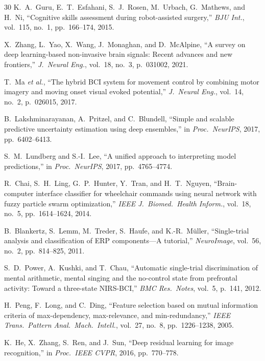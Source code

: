 \documentclass[conference]{IEEEtran}
\begin{document}
\begin{thebibliography}{30}
K.~A.~Guru, E.~T.~Esfahani, S.~J.~Rosen, M.~Urbach, G.~Mathews, and H.~Ni, ``Cognitive skills assessment during robot-assisted surgery,'' \emph{BJU Int.}, vol.~115, no.~1, pp.~166--174, 2015.

X.~Zhang, L.~Yao, X.~Wang, J.~Monaghan, and D.~McAlpine, ``A survey on deep learning-based non-invasive brain signals: Recent advances and new frontiers,'' \emph{J.\ Neural Eng.}, vol.~18, no.~3, p.~031002, 2021.

T.~Ma \emph{et al.}, ``The hybrid BCI system for movement control by combining motor imagery and moving onset visual evoked potential,'' \emph{J.\ Neural Eng.}, vol.~14, no.~2, p.~026015, 2017.

B.~Lakshminarayanan, A.~Pritzel, and C.~Blundell, ``Simple and scalable predictive uncertainty estimation using deep ensembles,'' in \emph{Proc.\ NeurIPS}, 2017, pp.~6402--6413.

S.~M.~Lundberg and S.-I.~Lee, ``A unified approach to interpreting model predictions,'' in \emph{Proc.\ NeurIPS}, 2017, pp.~4765--4774.

R.~Chai, S.~H.~Ling, G.~P.~Hunter, Y.~Tran, and H.~T.~Nguyen, ``Brain-computer interface classifier for wheelchair commands using neural network with fuzzy particle swarm optimization,'' \emph{IEEE J.\ Biomed.\ Health Inform.}, vol.~18, no.~5, pp.~1614--1624, 2014.

B.~Blankertz, S.~Lemm, M.~Treder, S.~Haufe, and K.-R.~M\"uller, ``Single-trial analysis and classification of ERP components---A tutorial,'' \emph{NeuroImage}, vol.~56, no.~2, pp.~814--825, 2011.

S.~D.~Power, A.~Kushki, and T.~Chau, ``Automatic single-trial discrimination of mental arithmetic, mental singing and the no-control state from prefrontal activity: Toward a three-state NIRS-BCI,'' \emph{BMC Res.\ Notes}, vol.~5, p.~141, 2012.

H.~Peng, F.~Long, and C.~Ding, ``Feature selection based on mutual information criteria of max-dependency, max-relevance, and min-redundancy,'' \emph{IEEE Trans.\ Pattern Anal.\ Mach.\ Intell.}, vol.~27, no.~8, pp.~1226--1238, 2005.

K.~He, X.~Zhang, S.~Ren, and J.~Sun, ``Deep residual learning for image recognition,'' in \emph{Proc.\ IEEE CVPR}, 2016, pp.~770--778.

\end{thebibliography}
\end{document}
